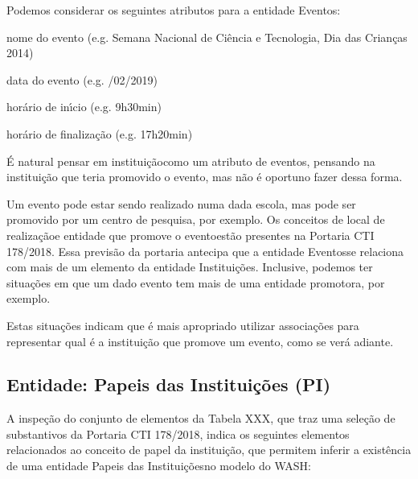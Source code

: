 \documentclass[
12pt,		%
openright,	%
twoside,  %
a4paper,			%
chapter=TITLE,		%
english,			%
french,				%
spanish,			%
brazil				%
]{USPSC-classe/USPSC}
\begin{document}
Podemos considerar os seguintes atributos para a entidade \textquotedbl Eventos\textquotedbl :





\begin{alineas}
\item nome do evento (e.g. \textquotedbl Semana Nacional de Ci\^encia e Tecnologia\textquotedbl , \textquotedbl Dia das Crian\c{c}as 2014\textquotedbl )
\item data do evento (e.g. /02/2019\textquotedbl )
\item hor\'ario de in\'{\i}cio (e.g. \textquotedbl 9h30min\textquotedbl )
\item hor\'ario de finaliza\c{c}\~ao (e.g. \textquotedbl 17h20min\textquotedbl )
\end{alineas}

\'E natural pensar em \textquotedbl institui\c{c}\~ao\textquotedbl  como um atributo de eventos, pensando na institui\c{c}\~ao que teria promovido o evento, mas n\~ao \'e oportuno fazer dessa forma.




Um evento pode estar sendo realizado numa dada escola, mas pode ser promovido por um centro de pesquisa, por exemplo. Os conceitos de \textquotedbl local de realiza\c{c}\~ao\textquotedbl  e \textquotedbl entidade que promove o evento\textquotedbl  est\~ao presentes na Portaria CTI 178/2018. Essa previs\~ao da portaria antecipa que a entidade \textquotedbl Eventos\textquotedbl  se relaciona com mais de um elemento da entidade \textquotedbl Institui\c{c}\~oes\textquotedbl . Inclusive, podemos ter situa\c{c}\~oes em que um dado evento tem mais de uma entidade promotora, por exemplo.




Estas situa\c{c}\~oes indicam que \'e mais apropriado utilizar associa\c{c}\~oes para representar qual \'e a institui\c{c}\~ao que promove um evento, como se ver\'a adiante.




\subsection[Entidade: Papeis das Institui\c{c}\~oes (PI)]{Entidade: Papeis das Institui\c{c}\~oes (PI)}\label{Entidade: Papeis das Institui\c{c}\~oes (PI)}
A inspe\c{c}\~ao do conjunto de elementos da Tabela XXX, que traz uma sele\c{c}\~ao de substantivos da Portaria CTI 178/2018, indica os seguintes elementos relacionados ao conceito de \textquotedbl papel da institui\c{c}\~ao\textquotedbl , que permitem inferir a exist\^encia de uma entidade \textquotedbl Papeis das Institui\c{c}\~oes\textquotedbl  no modelo do WASH:
\end{document}
